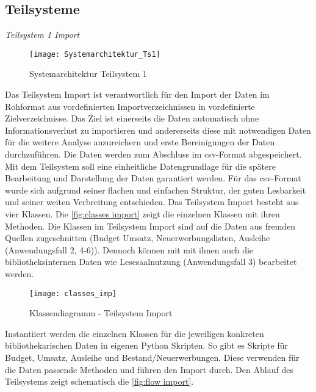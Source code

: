     \subsection{Teilsysteme}
    \label{chap:five_one_three}
    \textit{Teilsystem 1 Import}\\

    \begin{figure}[H]
        \centering
            \texttt{[image: Systemarchitektur\_Ts1]}
            \caption{Systemarchitektur Teilsystem 1}
            \label{fig:Systemarchitektur Teilsystem 1}
    \end{figure}


    Das Teilsystem Import ist verantwortlich für den Import der Daten im Rohformat aus vordefinierten Importverzeichnissen 
    in vordefinierte Zielverzeichnisse. Das Ziel ist einerseits die Daten automatisch ohne Informationsverlust zu importieren 
    und andererseits diese mit notwendigen Daten für die weitere Analyse anzureichern und erste Bereinigungen der Daten durchzuführen. 
    Die Daten werden zum Abschluss im csv-Format abgespeichert. Mit dem Teilsystem soll eine einheitliche Datengrundlage für die spätere 
    Bearbeitung und Darstellung der Daten garantiert werden. Für das csv-Format wurde sich aufgrund seiner flachen und einfachen Struktur, der guten Lesbarkeit
    und seiner weiten Verbreitung entschieden.
    Das Teilsystem Import besteht aus vier Klassen. Die \autoref{fig:classes import} zeigt die einzelnen Klassen mit ihren Methoden.
    Die Klassen im Teilsystem Import sind auf die Daten aus fremden Quellen zugeschnitten
    (Budget Umsatz, Neuerwerbungslisten, Ausleihe (Anwendungsfall 2, 4-6)). Dennoch können mit mit ihnen auch die bibliotheksinternen Daten
    wie Lesesaalnutzung (Anwendungsfall 3) bearbeitet werden. 
    \begin{figure}[H]
        \centering
            \texttt{[image: classes\_imp]}
            \caption{Klassendiagramm - Teilsystem Import}
            \label{fig:classes import}
    \end{figure}

    Instantiiert werden die einzelnen Klassen für die jeweiligen konkreten bibliothekarischen Daten in eigenen Python Skripten. 
    So gibt es Skripte für Budget, Umsatz, Ausleihe und Bestand/Neuerwerbungen. Diese verwenden für die Daten passende Methoden
    und führen den Import durch.
    Den Ablauf des Teilsystems zeigt schematisch die \autoref{fig:flow import}.


